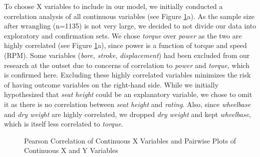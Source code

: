 \documentclass[
]{article}
\begin{document}
To choose X variables to include in our model, we initially conducted a
correlation analysis of all continuous variables (see Figure
\ref{fig:side-by-side-plots}a). As the sample size after wrangling
(n=1135) is not very large, we decided to not divide
our data into exploratory and confirmation sets. We chose \emph{torque} over
\emph{power} as the two are highly correlated (see Figure
\ref{fig:side-by-side-plots}a), since power is a function of torque and
speed (RPM). Some variables (\emph{bore, stroke}, \emph{displacement}) had been
excluded from our research at the outset due to concerns of correlation
to \emph{power} and \emph{torque,} which is confirmed here. Excluding these highly
correlated variables minimizes the risk of having outcome variables on
the right-hand side. While we initially hypothesized that \emph{seat height}
could be an explanatory variable, we chose to omit it as there is no
correlation between \emph{seat height} and \emph{rating}. Also, since \emph{wheelbase}
and \emph{dry weight} are highly correlated, we dropped \emph{dry weight} and kept
\emph{wheelbase}, which is itself less correlated to \emph{torque}.

\begin{figure}
\caption{Pearson Correlation of Continuous X Variables and Pairwise Plots of Continuous X and Y Variables}\label{fig:side-by-side-plots}
\end{figure}
\end{document}
